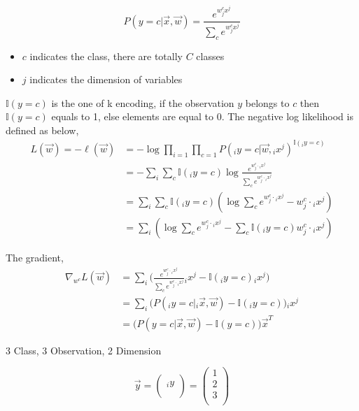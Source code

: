 \documentclass[12pt,a4paper]{article}%
\theoremstyle{definition}
\theoremstyle{plain}
\numberwithin{equation}{section}
\newcounter{subsubsubsection}[subsubsection]
\begin{document}
\begin{equation*}
P(y = c| \vec{x} ,\vec{w}) = \frac{e^{w^{c}_{j} x^{j}}} { \sum\limits_{c} e^{ w^{c}_{j} x^{j} } }
\end{equation*}

\begin{itemize}
\item $c$ indicates the class, there are totally $C$ classes
\item $j$ indicates the dimension of variables	
\end{itemize}

$\mathbb{I}(y=c)$ is the one of k encoding, if the observation $y$ belongs to $c$ then $\mathbb{I}(y=c)$ equals to 1, else elements are equal to 0.
The negative log likelihood is defined as below, 
\begin{align*}
L(\vec{w}) = -\ell(\vec{w}) &= - \log \prod\limits_{i=1} \prod\limits_{c=1}  P( {}_iy = c | \vec{w}, {}_ix^{j} )^{\mathbb{I}({}_iy = c)} \\
										  &= - \sum\limits_{i} \sum\limits_{c}  \mathbb{I}({}_iy = c) \log \frac{e^{ w^{c}_{j} \cdot {}_ix^{j} }} { \sum\limits_{c} e^{ w^{c}_{j} \cdot {}_ix^{j} } } \\
										  &= \sum\limits_{i} \sum\limits_{c} \mathbb{I}({}_iy = c) ( \log \sum\limits_{c} e^{ w^{c}_{j} \cdot {}_ix^{j} } - w^{c}_{j} \cdot {}_ix^{j}  ) \\
										  &= \sum\limits_{i} ( \log \sum\limits_{c} e^{ w^{c}_{j} \cdot {}_ix^{j} } - \sum\limits_{c} \mathbb{I}({}_iy = c)  w^{c}_{j} \cdot {}_ix^{j}  )
\end{align*}

The gradient, 
\begin{align*}
\nabla_{ w^{c} } L(\vec{w}) &= \sum\limits_{i} \big( \frac{e^{w^{c}_{j} \cdot {}_ix^{j}}} { \sum\limits_{c} e^{ w^{c}_{j} \cdot {}_ix^{j} } } {}_ix^{j} - \mathbb{I}({}_iy=c) {}_ix^{j}  \big)  \\ 
														       &= \sum\limits_{i} \big(  P( {}_iy = c |  {}_i\vec{x}, \vec{w})  - \mathbb{I}({}_iy=c)   \big) {}_ix^{j} \\
														       &=  \big(  P( y = c |  \vec{x}, \vec{w})  - \mathbb{I}(y=c)   \big)  \vec{x}^{T}
\end{align*}

3 Class, 3 Observation, 2 Dimension

\begin{equation}
\vec{y} = \begin{pmatrix}
           \\
  {}_iy \\
            \\
\end{pmatrix} =  \begin{pmatrix}
         1  \\
         2 \\
         3  \\
\end{pmatrix}   
\end{equation} 
\end{document}
